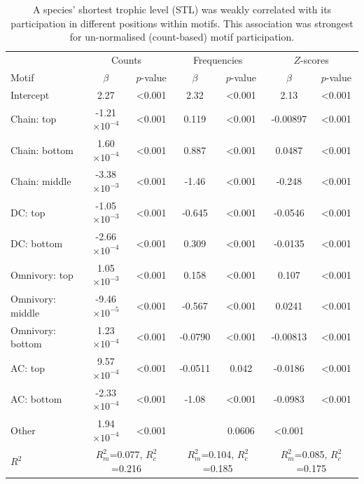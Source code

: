 \documentclass[12pt]{article}
\begin{document}
\begin{spacing}{2.0}
			\begin{table}[hb!]
    			\caption{A species' shortest trophic level (STL) was weakly correlated with its participation in different positions within motifs. This association was strongest for un-normalised (count-based) motif participation.}
    			\label{tab:positions_vs_STL}
    			\begin{tabular}{l | c c | c c | c c}
    			& \multicolumn{2}{c|}{Counts} & \multicolumn{2}{c|}{Frequencies} & \multicolumn{2}{c}{$Z$-scores} \\
    			Motif & $\beta$ & $p$-value & $\beta$ & $p$-value & $\beta$ & $p$-value \\
    			\hline
                Intercept	&	2.27	&	\textless0.001	&	2.32	&	\textless0.001	&	2.13	&	\textless0.001	\\
                Chain: top	&	-1.21$\times10^{-4}$	&	\textless0.001	&	0.119	&	\textless0.001	&	-0.00897	&	\textless0.001	\\
                Chain: bottom	&	1.60$\times10^{-4}$	&	\textless0.001	&	0.887	&	\textless0.001	&	0.0487	&	\textless0.001	\\
                Chain: middle	&	-3.38$\times10^{-3}$	&	\textless0.001	&	-1.46	&	\textless0.001	&	-0.248	&	\textless0.001	\\
                DC: top	&	-1.05$\times10^{-3}$	&	\textless0.001	&	-0.645	&	\textless0.001	&	-0.0546	&	\textless0.001	\\
                DC: bottom	&	-2.66$\times10^{-4}$	&	\textless0.001	&	0.309	&	\textless0.001	&	-0.0135	&	\textless0.001	\\
                Omnivory: top	&	1.05$\times10^{-3}$	&	\textless0.001	&	0.158	&	\textless0.001	&	0.107	&	\textless0.001	\\
                Omnivory: middle	&	-9.46$\times10^{-5}$ &	\textless0.001	&	-0.567	&	\textless0.001	&	0.0241	&	\textless0.001	\\
                Omnivory: bottom	&	1.23$\times10^{-4}$	&	\textless0.001	&	-0.0790	&	\textless0.001	&	-0.00813	&	\textless0.001	\\
                AC: top	&	9.57$\times10^{-4}$	&	\textless0.001	&	-0.0511	&	0.042	&	-0.0186	&	\textless0.001	\\
                AC: bottom	&	-2.33$\times10^{-4}$	&	\textless0.001	&	-1.08	&	\textless0.001	&	-0.0983	&	\textless0.001	\\
                Other	&	1.94$\times10^{-4}$	&	\textless0.001	&				&	0.0606	&	\textless0.001	\\
    			\hline
    			$R^2$ & \multicolumn{2}{c|}{\tiny{$R^2_m$=0.077, $R^2_c$=0.216}} & 
    			\multicolumn{2}{c|}{\tiny{$R^2_m$=0.104, $R^2_c$=0.185}} & 
    			\multicolumn{2}{c}{\tiny{$R^2_m$=0.085, $R^2_c$=0.175}} \\
    			\end{tabular}
    			\end{table}


\end{spacing}
\end{document}
